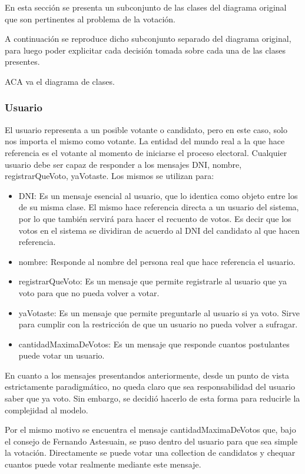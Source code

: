 
En esta secci\'on se presenta un subconjunto de las clases del diagrama original que son pertinentes al problema de la votaci\'on.

A continuaci\'on se reproduce dicho subconjunto separado del diagrama original, para luego poder explicitar cada decisi\'on tomada sobre cada una de las clases presentes.

ACA va el diagrama de clases.

\subsubsection{Usuario}

El usuario representa a un posible votante o candidato, pero en este caso, solo nos importa el mismo como votante. La entidad del mundo real a la que hace referencia es el votante al momento de iniciarse el proceso electoral. Cualquier usuario debe ser capaz de responder a los mensajes DNI, nombre, registrarQueVoto, yaVotaste. Los mismos se utilizan para:

\begin{itemize}
\item DNI: Es un mensaje esencial al usuario, que lo identica como objeto entre los de su misma clase. El mismo hace referencia directa a un usuario del sistema, por lo que tambi\'en servir\'a para hacer el recuento de votos. Es decir que los votos en el sistema se dividiran de acuerdo al DNI del candidato al que hacen referencia.
\item nombre: Responde al nombre del persona real que hace referencia el usuario.
\item registrarQueVoto: Es un mensaje que permite registrarle al usuario que ya voto para que no pueda volver a votar.
\item yaVotaste: Es un mensaje que permite preguntarle al usuario si ya voto. Sirve para cumplir con la restricci\'on de que un usuario no pueda volver a sufragar.
\item cantidadMaximaDeVotos: Es un mensaje que responde cuantos postulantes puede votar un usuario.
\end{itemize}

En cuanto a los mensajes presentandos anteriormente, desde un punto de vista estrictamente paradigm\'atico, no queda claro que sea responsabilidad del usuario saber que ya voto. Sin embargo, se decidi\'o hacerlo de esta forma para reducirle la complejidad al modelo.

Por el mismo motivo se encuentra el mensaje cantidadMaximaDeVotos que, bajo el consejo de Fernando Astesuain, se puso dentro del usuario para que sea simple la votaci\'on. Directamente se puede votar una collection de candidatos y chequar cuantos puede votar realmente mediante este mensaje.

